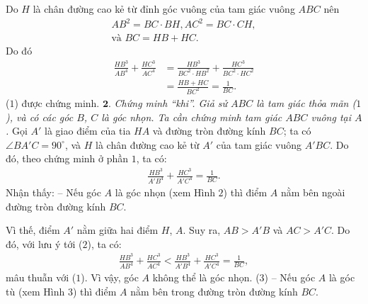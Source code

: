 \begin{multicols}{2}
	Do $H$ là chân đường cao kẻ từ đỉnh góc vuông của tam giác vuông $ABC$ nên
	\begin{align*}
		A{B^2} = BC \cdot BH, AC^2 = BC \cdot CH,\\
		\text{và }	BC = HB + HC.
	\end{align*}
	Do đó
	\begin{align*}
		\frac{{H{B^3}}}{{A{B^4}}} + \frac{{H{C^3}}}{{A{C^4}}} &= \frac{{H{B^3}}}{{B{C^2} \cdot H{B^2}}} + \frac{{H{C^3}}}{{B{C^2} \cdot H{C^2}}} \\
		&= \frac{{HB + HC}}{{B{C^2}}} = \frac{1}{{BC}}.
	\end{align*}
	($1$) được chứng minh.
	\vskip 0.05cm
	$\pmb{2.}$ \textit{Chứng minh “khi”.
	Giả sử $ABC$ là tam giác thỏa mãn ($1$), và có các góc $B$, $C$ là góc nhọn. 
	Ta cần chứng minh tam giác $ABC$ vuông tại $A$.}
	Gọi $A'$ là giao điểm của tia $HA$ và đường tròn đường kính $BC$; ta có $\angle BA'C = 90^\circ$,  và $H$ là chân đường cao kẻ từ $A'$  của tam giác vuông $A'BC$. Do đó, theo chứng minh ở phần $1$, ta có:
	\begin{align*}
		\frac{{H{B^3}}}{{A'{B^4}}} + \frac{{H{C^3}}}{{A'{C^4}}} = \frac{1}{{BC}}. \tag{$2$}	
	\end{align*}
	Nhận thấy:
	\vskip 0.05cm
	-- Nếu góc $A$ là góc nhọn (xem Hình $2$) thì điểm $A$ nằm bên ngoài đường tròn đường kính $BC$.
	
	Vì thế, điểm $A'$ nằm giữa hai điểm $H$, $A$. Suy ra, $AB > A'B$  và $AC > A'C$.  Do đó, với lưu ý tới ($2$), ta có:
	\begin{align*}
		\frac{{H{B^3}}}{{A{B^4}}} + \frac{{H{C^3}}}{{A{C^4}}} < \frac{{H{B^3}}}{{A'{B^4}}} + \frac{{H{C^3}}}{{A'{C^4}}} = \frac{1}{{BC}},
	\end{align*}
	mâu thuẫn với ($1$). Vì vậy, góc $A$ không thể là góc nhọn.                     \hfill ($3$)
	\vskip 0.05cm
	-- Nếu góc $A$ là góc tù (xem Hình $3$) thì điểm $A$ nằm bên trong đường tròn đường kính $BC$.
	

\end{multicols}
